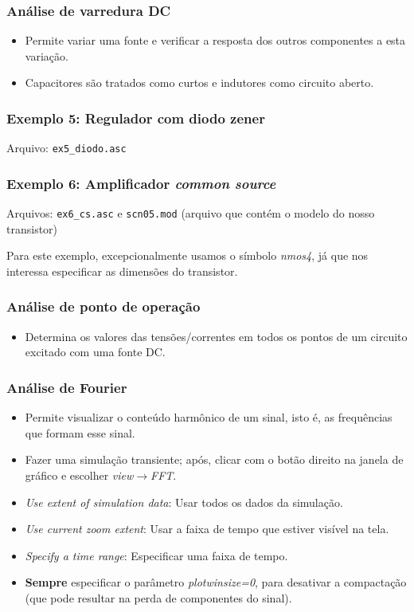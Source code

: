 \documentclass{beamer}
\begin{document}
\begin{frame}
\frametitle{Análise de varredura DC}
\begin{itemize}
\item{Permite variar uma fonte e verificar a resposta dos outros componentes a esta variação.}
\item{Capacitores são tratados como curtos e indutores como circuito aberto.}
\end{itemize}
\end{frame}

\begin{frame}
\frametitle{Exemplo 5: Regulador com diodo zener}
Arquivo: \texttt{ex5\_diodo.asc}
\end{frame}

\begin{frame}
\frametitle{Exemplo 6: Amplificador \textit{common source}}
Arquivos: \texttt{ex6\_cs.asc} e \texttt{scn05.mod} (arquivo que contém o modelo do nosso transistor)

Para este exemplo, excepcionalmente usamos o símbolo \textit{nmos4}, já que nos interessa especificar as dimensões do transistor.
\end{frame}

\begin{frame}
\frametitle{Análise de ponto de operação}
\begin{itemize}
\item{Determina os valores das tensões/correntes em todos os pontos de um circuito excitado com uma fonte DC.}
\end{itemize}
\end{frame}
\begin{frame}
\frametitle{Análise de Fourier}
\begin{itemize}
\item Permite visualizar o conteúdo harmônico de um sinal, isto é, as frequências que formam esse sinal.
\item Fazer uma simulação transiente; após, clicar com o botão direito na janela de gráfico e escolher \textit{view}$\rightarrow$\textit{FFT}.
\item \textit{Use extent of simulation data}: Usar todos os dados da simulação.
\item \textit{Use current zoom extent}: Usar a faixa de tempo que estiver visível na tela.
\item \textit{Specify a time range}: Especificar uma faixa de tempo.
\item \textbf{Sempre} especificar o parâmetro \textit{plotwinsize=0}, para desativar a compactação (que pode resultar na perda de componentes do sinal).
\end{itemize}
\end{frame}
\end{document}
